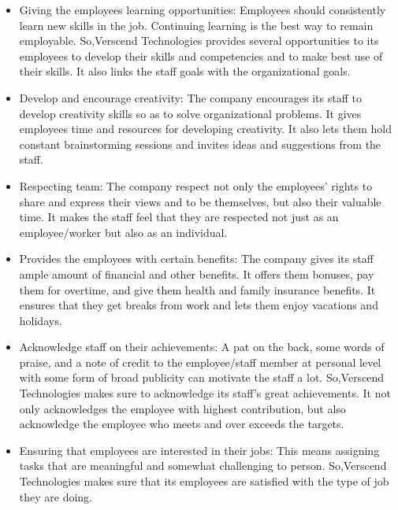 \begin{itemize}
\item  Giving the employees learning opportunities: Employees should consistently learn new skills in the
job. Continuing learning is the best way to remain employable. So,Verscend Technologies
provides several opportunities to its employees to develop their skills and competencies and to make
best use of their skills. It also links the staff goals with the organizational goals.
\item  Develop and encourage creativity: The company encourages its staff to develop creativity skills so
as to solve organizational problems. It gives employees time and resources for developing creativity.
It also lets them hold constant brainstorming sessions and invites ideas and suggestions from the staff.
\item  Respecting team: The company respect not only the employees’ rights to share and express their
views and to be themselves, but also their valuable time. It makes the staff feel that they are respected
not just as an employee/worker but also as an individual.
\item  Provides the employees with certain benefits: The company gives its staff ample amount of financial
and other benefits. It offers them bonuses, pay them for overtime,
and give them health and family insurance benefits. It ensures that they get breaks from work and lets
them enjoy vacations and holidays.
\item  Acknowledge staff on their achievements: A pat on the back, some words of praise, and a note of
credit to the employee/staff member at personal level with some form of broad publicity can motivate
the staff a lot. So,Verscend Technologies makes sure to acknowledge its staff's great
achievements. It not only acknowledges the employee with highest contribution, but also acknowledge
the employee who meets and over exceeds the targets.
\item  Ensuring that employees are interested in their jobs: This means assigning tasks that are
meaningful and somewhat challenging to person. So,Verscend Technologies makes sure
that its employees are satisfied with the type of job they are doing.
\end{itemize}
\cleardoublepage
\item
